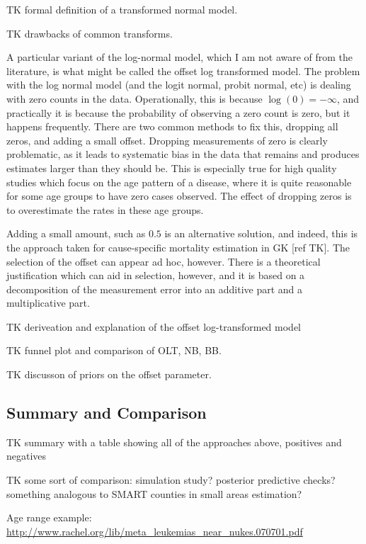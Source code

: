 TK formal definition of a transformed normal model.

TK drawbacks of common transforms.

A particular variant of the log-normal model, which I am not aware of
from the literature, is what might be called the offset log
transformed model.  The problem with the log normal model (and the
logit normal, probit normal, etc) is dealing with zero counts in the
data.  Operationally, this is because $\log(0) = -\infty$, and
practically it is because the probability of observing a zero
count is zero, but it happens frequently.  There are two common
methods to fix this, dropping all zeros, and adding a small offset.
Dropping measurements of zero is clearly problematic, as it leads to
systematic bias in the data that remains and produces estimates larger
than they should be.  This is especially true for high quality studies
which focus on the age pattern of a disease, where it is quite
reasonable for some age groups to have zero cases observed.  The
effect of dropping zeros is to overestimate the rates in these age
groups.

Adding a small amount, such as $0.5$ is an alternative solution, and
indeed, this is the approach taken for cause-specific mortality estimation
in GK [ref TK].  The selection of the offset can appear ad hoc,
however.  There is a theoretical justification which can aid in
selection, however, and it is based on a decomposition of the
measurement error into an additive part and a multiplicative part.

TK deriveation and explanation of the offset log-transformed model

TK funnel plot and comparison of OLT, NB, BB.

TK discusson of priors on the offset parameter.

\subsection{Summary and Comparison}
TK summary with a table showing all of the approaches above, positives
and negatives

TK some sort of comparison: simulation study? posterior predictive
checks? something analogous to SMART counties in small areas
estimation?

Age range example:
\url{
http://www.rachel.org/lib/meta_leukemias_near_nukes.070701.pdf
}
